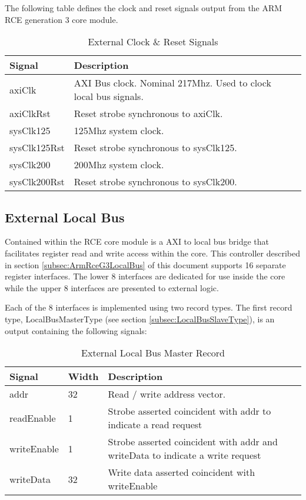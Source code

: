 \documentclass[11pt]{article}
\begin{document}
The following table defines the clock and reset signals output from the ARM RCE generation 3 core module.

\begin{table}[H]
\small
\centering
   \begin{tabular}{| l | l | l | }
      \hline \textbf{Signal} & \textbf{Description} \\
      \hline axiClk          & AXI Bus clock. Nominal 217Mhz. Used to clock local bus signals.      \\
      \hline axiClkRst       & Reset strobe synchronous to axiClk.                                  \\
      \hline sysClk125       & 125Mhz system clock.  \\
      \hline sysClk125Rst    & Reset strobe synchronous to sysClk125.                               \\
      \hline sysClk200       & 200Mhz system clock.  \\
      \hline sysClk200Rst    & Reset strobe synchronous to sysClk200.                               \\
      \hline
   \end{tabular}
   \caption{External Clock \& Reset Signals}
\end{table}

\subsection{External Local Bus}
\label{subsec:external_local_bus}

Contained within the RCE core module is a AXI to local bus bridge that facilitates register read and write access within the core. 
This controller described in section \ref{subsec:ArmRceG3LocalBus} of this document supports 16 separate register interfaces. The
lower 8 interfaces are dedicated for use inside the core while the upper 8 interfaces are presented to external logic.

Each of the 8 interfaces is implemented using two record types. The first record type, LocalBusMasterType (see section \ref{subsec:LocalBusSlaveType}), 
is an output containing the following signals:

\begin{table}[H]
\small
\centering
   \begin{tabular}{| l | l | l | }
      \hline \textbf{Signal} & \textbf{Width}  & \textbf{Description} \\
      \hline addr            & 32              & Read / write address vector.                         \\
      \hline readEnable      & 1               & Strobe asserted coincident with addr to indicate a read request \\
      \hline writeEnable     & 1               & Strobe asserted coincident with addr and writeData to indicate a write request \\
      \hline writeData       & 32              & Write data asserted coincident with writeEnable  \\
      \hline
   \end{tabular}
   \caption{External Local Bus Master Record}
\end{table}
\end{document}
